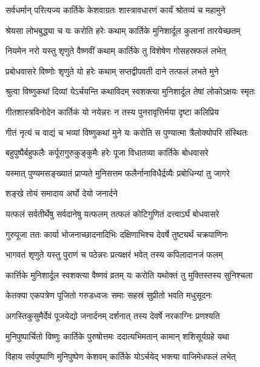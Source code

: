 \twolineshloka
{सर्वधर्मान् परित्यज्य कार्तिके केशवाग्रतः}%
{शास्त्रावधारणं कार्यं श्रोतव्यं च महामुने}

\twolineshloka
{श्रेयसा लोभबुद्ध्या च यः करोति हरेः कथाम्}%
{कार्तिके मुनिशार्दूल कुलानां तारयेच्छतम्}

\twolineshloka
{नियमेन नरो यस्तु शृणुते वैष्णवीं कथाम्}%
{कार्तिके तु विशेषेण गोसहस्रफलं लभेत्}

\twolineshloka
{प्रबोधवासरे विष्णोः शृणुते यो हरेः कथाम्}%
{सप्तद्वीपवती दाने तत्फलं लभते मुने}

\twolineshloka
{श्रुत्वा विष्णुकथां दिव्यां येऽर्चयन्ति कथाविदम्}%
{स्वशक्त्या मुनिशार्दूल तेषां लोकोऽक्षयः स्मृतः}

\twolineshloka
{गीतशास्त्रविनोदेन कार्तिकं यो नयेन्नरः}%
{न तस्य पुनरावृत्तिर्मया दृष्टा कलिप्रिय}

\twolineshloka
{गीतं नृत्यं च वाद्यं च भव्यां विष्णुकथां मुने}%
{यः करोति स पुण्यात्मा त्रैलोक्योपरि संस्थितः}

\twolineshloka
{बहुपुष्पैर्बहुफलैः कर्पूरागुरुकुङ्कुमैः}%
{हरेः पूजा विधातव्या कार्तिके बोधवासरे}

\twolineshloka
{यस्मात् पुण्यमसङ्ख्यातं प्राप्यते मुनिसत्तम}%
{फलैर्नानाविधैर्द्रव्यैः प्रबोधिन्यां तु जागरे}

\onelineshloka
{शङ्खे तोयं समादाय अर्घो देयो जनार्दने}%

\twolineshloka
{यत्फलं सर्वतीर्थेषु सर्वदानेषु यत्फलम्}
{तत्फलं कोटिगुणितं दत्त्वाऽर्घं बोधवासरे}%

\twolineshloka
{गुरुपूजा ततः कार्या भोजनाच्छादनादिभिः}
{दक्षिणाभिश्च देवर्षे तुष्ट्यर्थं चक्रपाणिनः}%

\twolineshloka
{भागवतं शृणुते यस्तु पुराणं च पठेन्नरः}
{प्रत्यक्षरं भवेत् तस्य कपिलादानजं फलम्}%

\twolineshloka
{कार्त्तिके मुनिशार्दूल स्वशक्त्या वैष्णवं व्रतम्}
{यः करोति यथोक्तं तु मुक्तिस्तस्य सुनिश्चला}%

\twolineshloka
{केतक्या एकपत्रेण पूजितो गरुडध्वजः}
{समाः सहस्रं सुप्रीतो भवति मधुसूदनः}%

\twolineshloka
{अगस्तिकुसुमैर्देवं पूजयेद्यो जनार्दनम्}
{दर्शनात् तस्य देवर्षे नरकाग्निः प्रणश्यति}%

\twolineshloka
{मुनिपुष्पार्चितो विष्णुः कार्तिके पुरुषोत्तमः}
{ददात्यभिमतान् कामान् शशिसूर्यग्रहे यथा}%

\twolineshloka
{विहाय सर्वपुष्पाणि मुनिपुष्पेण केशवम्}
{कार्तिके योऽर्चयेद् भक्त्या वाजिमेधफलं लभेत्}%

